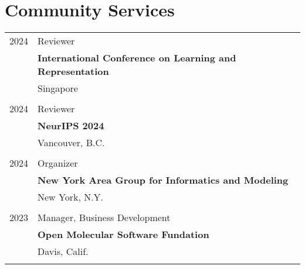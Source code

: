 \section{Community Services}
\begin{longtable}{p{} p{} }
\textsc{2024} & Reviewer \\
& \textbf{International Conference on Learning and Representation} \\
& Singapore \\\\


2024 & Reviewer \\
& \textbf{NeurIPS 2024} \\
& Vancouver, B.C. \\\\

\textsc{2024} & Organizer \\
& \textbf{New York Area Group for Informatics and Modeling} \\
& New York, N.Y. \\\\


\textsc{2023} & Manager, Business Development \\
& \textbf{Open Molecular Software Fundation} \\
& Davis, Calif. \\\\




\end{longtable}


